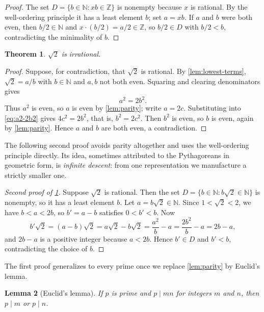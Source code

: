 \documentclass[11pt]{article}
\theoremstyle{plain}
\newtheorem{theorem}{Theorem}[section]
\newtheorem{lemma}[theorem]{Lemma}
\theoremstyle{definition}
\theoremstyle{remark}
\newcommand{\Z}{\mathbb{Z}}
\newcommand{\N}{\mathbb{N}}
\begin{document}
\begin{proof}
The set $D = \{ b \in \N : x b \in \Z \}$ is nonempty because $x$ is rational. By the well-ordering principle it has a least element $b$; set $a = xb$. If $a$ and $b$ were both even, then $b/2 \in \N$ and $x \cdot (b/2) = a/2 \in \Z$, so $b/2 \in D$ with $b/2 < b$, contradicting the minimality of $b$.
\end{proof}

\begin{theorem}
\label{thm:sqrt2}
$\sqrt{2}$ is irrational.
\end{theorem}

\begin{proof}
Suppose, for contradiction, that $\sqrt{2}$ is rational. By \cref{lem:lowest-terms}, $\sqrt{2} = a/b$ with $b \in \N$ and $a, b$ not both even. Squaring and clearing denominators gives
\begin{equation}
  a^2 = 2b^2.
  \label{eq:a2-2b2}
\end{equation}
Thus $a^2$ is even, so $a$ is even by \cref{lem:parity}; write $a = 2c$. Substituting into \eqref{eq:a2-2b2} gives $4c^2 = 2b^2$, that is, $b^2 = 2c^2$. Then $b^2$ is even, so $b$ is even, again by \cref{lem:parity}. Hence $a$ and $b$ are both even, a contradiction.
\end{proof}

The following second proof avoids parity altogether and uses the well-ordering principle directly. Its idea, sometimes attributed to the Pythagoreans in geometric form, is \emph{infinite descent}: from one representation we manufacture a strictly smaller one.

\begin{proof}[Second proof of \cref{thm:sqrt2}]
Suppose $\sqrt{2}$ is rational. Then the set $D = \{ b \in \N : b\sqrt{2} \in \N \}$ is nonempty, so it has a least element $b$. Let $a = b\sqrt{2} \in \N$. Since $1 < \sqrt{2} < 2$, we have $b < a < 2b$, so $b' = a - b$ satisfies $0 < b' < b$. Now
\[
  b'\sqrt{2} = (a - b)\sqrt{2} = a\sqrt{2} - b\sqrt{2} = \frac{a^2}{b} - a = \frac{2b^2}{b} - a = 2b - a,
\]
and $2b - a$ is a positive integer because $a < 2b$. Hence $b' \in D$ and $b' < b$, contradicting the choice of $b$.
\end{proof}

The first proof generalizes to every prime once we replace \cref{lem:parity} by Euclid's lemma.

\begin{lemma}[Euclid's lemma]
\label{lem:euclid}
If $p$ is prime and $p \mid mn$ for integers $m$ and $n$, then $p \mid m$ or $p \mid n$.
\end{lemma}
\end{document}
